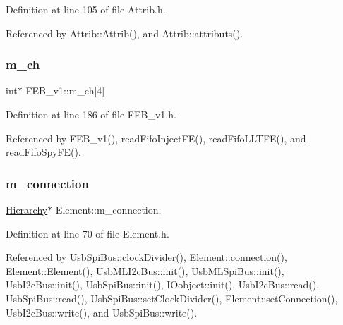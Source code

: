 Definition at line 105 of file Attrib.\+h.



Referenced by Attrib\+::\+Attrib(), and Attrib\+::attributs().

\mbox{\label{classFEB__v1_a383c35f10769b16c6a719494594899c6}} 
\subsubsection{\texorpdfstring{m\+\_\+ch}{m\_ch}}
{\footnotesize\ttfamily int$\ast$ F\+E\+B\+\_\+v1\+::m\+\_\+ch\mbox{[}4\mbox{]}\hspace{0.3cm}{\ttfamily [private]}}



Definition at line 186 of file F\+E\+B\+\_\+v1.\+h.



Referenced by F\+E\+B\+\_\+v1(), read\+Fifo\+Inject\+F\+E(), read\+Fifo\+L\+L\+T\+F\+E(), and read\+Fifo\+Spy\+F\+E().

\mbox{\label{classElement_abe3de7a5dbbc9a6dd2d7e012e5fdb266}} 
\subsubsection{\texorpdfstring{m\+\_\+connection}{m\_connection}}
{\footnotesize\ttfamily \hyperlink{classHierarchy}{Hierarchy}$\ast$ Element\+::m\+\_\+connection\hspace{0.3cm}{\ttfamily [protected]}, {\ttfamily [inherited]}}



Definition at line 70 of file Element.\+h.



Referenced by Usb\+Spi\+Bus\+::clock\+Divider(), Element\+::connection(), Element\+::\+Element(), Usb\+M\+L\+I2c\+Bus\+::init(), Usb\+M\+L\+Spi\+Bus\+::init(), Usb\+I2c\+Bus\+::init(), Usb\+Spi\+Bus\+::init(), I\+Oobject\+::init(), Usb\+I2c\+Bus\+::read(), Usb\+Spi\+Bus\+::read(), Usb\+Spi\+Bus\+::set\+Clock\+Divider(), Element\+::set\+Connection(), Usb\+I2c\+Bus\+::write(), and Usb\+Spi\+Bus\+::write().

\mbox{\label{classFEB__v1_a1c9dbc3660021dba1f58666d0097abb0}} 

